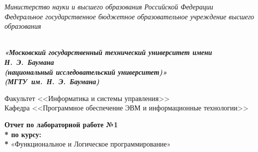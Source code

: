 
\begin{titlepage}
\thispagestyle{empty}

{\large
\begin{center}
	\textsl{Министерство науки и высшего образования Российской Федерации \\ Федеральное государственное бюджетное образовательное учреждение высшего образования}
	\vspace{2em}
\end{center}
}
{
\begin{minipage}[t]{0.13\textwidth}
	\centering{}
	\end{minipage}\hfill
\begin{minipage}[t]{0.65\textwidth}
	\begin{center}
		\large  \textsl{\textbf {\\ «Московский государственный технический университет имени Н.~Э.~Баумана \\ (национальный исследовательский университет)» \\ (МГТУ~им.~Н.~Э.~Баумана)}}
	\end{center}
\end{minipage}
}

\vspace{2em}

\hrulefill

\begin{center}
 	\vspace{0pt plus2fill} %
	{\large
	Факультет  <<Информатика и системы управления>>\\
	Кафедра  <<Программное обеспечение ЭВМ и информационные технологии>>
	}
\end{center}

{\Large
\begin{center}
	\textbf{Отчет по лабораторной работе №1 \\* по курсу: \\* } «Функциональное и Логическое программирование» \\
\end{center}
}
%
\vspace{0pt plus4fill} %


\end{titlepage}
